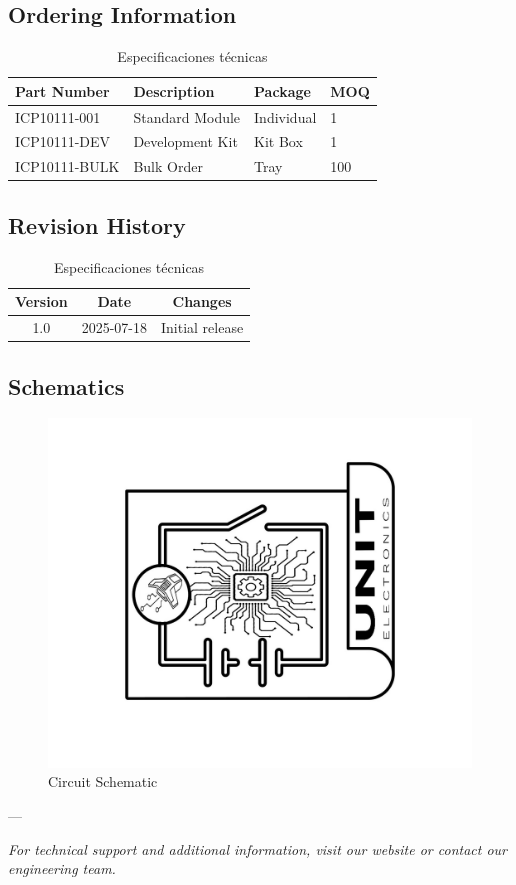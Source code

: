 \documentclass[11pt,a4paper]{article}
\begin{document}
\subsection{Ordering Information}


\begin{table}[H]
\centering
\small
\begin{tabular}{|l|l|l|l|}
\hline
Part Number & Description & Package & MOQ \\
\hline
ICP10111-001 & Standard Module & Individual & 1 \\
ICP10111-DEV & Development Kit & Kit Box & 1 \\
ICP10111-BULK & Bulk Order & Tray & 100 \\
\hline
\end{tabular}
\caption{Especificaciones técnicas}
\end{table}


\subsection{Revision History}


\begin{table}[H]
\centering
\small
\begin{tabular}{|c|c|c|}
\hline
Version & Date & Changes \\
\hline
1.0 & 2025-07-18 & Initial release \\
\hline
\end{tabular}
\caption{Especificaciones técnicas}
\end{table}


\subsection{Schematics}


\begin{figure}[H]
\centering
\includegraphics[width=\textwidth]{en_Schematics_icon.jpg}
\caption{Circuit Schematic}
\label{fig:en-Schematics-icon-jpg}
\end{figure}



---

\textit{For technical support and additional information, visit our website or contact our engineering team.}
\end{document}
